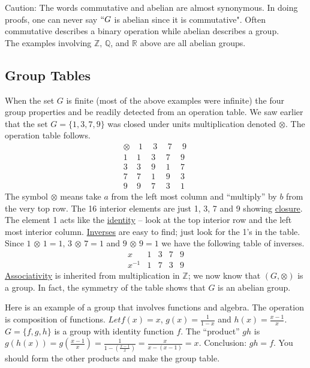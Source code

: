 \documentclass[12pt]{book}
\theoremstyle{definition}
\def\Z{\mathbb{Z}}
\begin{document}
Caution: The words commutative and abelian are almost synonymous. In doing proofs, one can never say $ ``G $ is abelian since it is commutative". Often commutative describes a binary operation while abelian describes a group. \\

	

The examples involving $\Z,\, \mathbb{Q}$, and $\mathbb{R}$ above are all abelian groups.
\newpage
\subsection{Group Tables}

\rule{0in}{.1in}
When the set $G$ is finite (most of the above examples were infinite) the four group properties and be readily detected from an operation table. We saw earlier that the set $G=\{1,3,7,9\}$ was closed under units multiplication denoted $\otimes$.  The operation table follows.
$$\begin{array}{c|cccc}
\otimes & ~1~& ~3~ & ~7~ & ~9~\\
\hline
1 & 1 & 3 & 7 & 9\\
3 & 3 & 9 & 1 & 7\\
7 & 7 & 1 & 9 & 3\\
9 & 9 & 7 & 3 & 1
\end{array}$$
The symbol $\otimes$ means take $a$ from the left most column and ``multiply'' by $b$ from the very top row.  The 16 interior elements are just 1, 3, 7 and 9 showing \underline{closure}.  The element 1 acts like the \underline{identity}  -- look at the top interior row and the left most interior column.  \underline{Inverses} are easy to find;  just look for the 1's in the table.  Since $1\,\otimes\, 1=1,\,3\,\otimes\,7=1$ and  $9\,\otimes\,9=1$ we have the following table of inverses.
$$\begin{array}{c|cccc}
x & 1 & 3 & 7 & 9\\
\hline
x^{-1} & 1 & 7 & 3 & 9
\end{array}$$
\underline{Associativity} is inherited from multiplication in $\Z$; we now know that $(G,\otimes)$ is a group.  In fact, the symmetry of the table shows that $G$ is an abelian group.\\

\begin{tcexample}{}{}
 Here is an example of a group that involves functions and algebra.  The operation is composition of functions.  $ Let  $$f(x)=x$, $g(x)=\frac{1}{1-x}$ and $h(x)=\frac{x-1}{x}$.  $G=\{f,g,h\}$ is a group with identity function $f$.  The ``product'' $gh$ is $g(h(x))=g(\frac{x-1}{x})=\frac{1}{1-(\frac{x-1}{x})}=\frac{x}{x-(x-1)}=x$.  Conclusion: $gh=f$.  You should form the other products and make the group table.
\end{tcexample}
\end{document}
